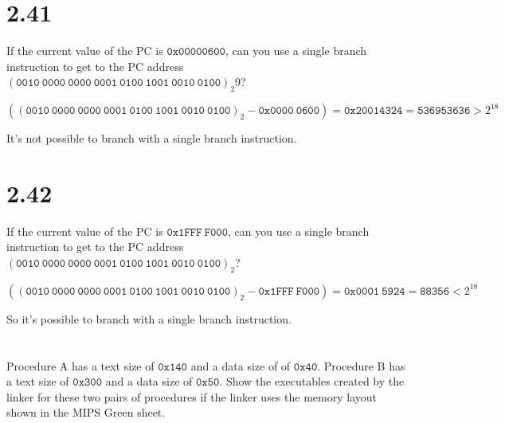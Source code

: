 \documentclass[paper=a4, fontsize=11pt]{scrartcl} %
\begin{document}
\section{2.41}

\begin{fancyquotes}

  If the current value of the PC is $\mathtt{0x00000600}$, can you use a single
  branch instruction to get to the PC address $(\mathtt{0010\ 0000\ 0000\ 0001\
  0100\ 1001\ 0010\ 0100})_2$9?

\end{fancyquotes}

$((\mathtt{0010\ 0000\ 0000\ 0001\ 0100\ 1001\ 0010\ 0100})_2
- \mathtt{0x0000\ 0600})
= \mathtt{0x20014324}
= \mathtt{536953636}
> 2^{18}$

It's not possible to branch with a single branch instruction.


\section{2.42}

\begin{fancyquotes}

  If the current value of the PC is $\mathtt{0x1FFF\ F000}$, can you use a
  single branch instruction to get to the PC address $(\mathtt{0010\ 0000\ 0000\
  0001\ 0100\ 1001\ 0010\ 0100})_2$?

\end{fancyquotes}

$((\mathtt{0010\ 0000\ 0000\ 0001\ 0100\ 1001\ 0010\ 0100})_2
- \mathtt{0x1FFF\ F000})
= \mathtt{0x0001\ 5924}
= \mathtt{88356}
< 2^{18}$

So it's possible to branch with a single branch instruction.


\section{}

\begin{fancyquotes}

  Procedure A has a text size of $\mathtt{0x140}$ and a data size of of
  $\mathtt{0x40}$. Procedure B has a text size of $\mathtt{0x300}$ and a data
  size of $\mathtt{0x50}$. Show the executables created by the linker for these
  two pairs of procedures if the linker uses the memory layout shown in the MIPS
  Green sheet.

\end{fancyquotes}
\end{document}
